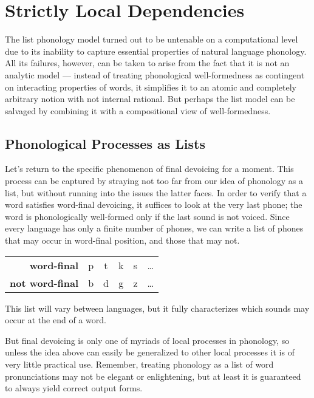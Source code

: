 \chapter{Strictly Local Dependencies}
\label{cha:SL}

The list phonology model turned out to be untenable on a computational level due to its inability to capture essential properties of natural language phonology.
All its failures, however, can be taken to arise from the fact that it is not an analytic model --- instead of treating phonological well-formedness as contingent on interacting properties of words, it simplifies it to an atomic and completely arbitrary notion with not internal rational.
But perhaps the list model can be salvaged by combining it with a compositional view of well-formedness.

\section{Phonological Processes as Lists}
Let's return to the specific phenomenon of final devoicing for a moment.
This process can be captured by straying not too far from our idea of phonology as a list, but without running into the issues the latter faces.
In order to verify that a word satisfies word-final devoicing, it suffices to look at the very last phone;
the word is phonologically well-formed only if the last sound is not voiced.
Since every language has only a finite number of phones, we can write a list of phones that may occur in word-final position, and those that may not.
%
\begin{center}
    \begin{tabular}{r@{\hskip 2em}ccccc}
        \textbf{word-final}     & p & t & k & s & \ldots\\
        \textbf{not word-final} & b & d & g & z & \ldots
    \end{tabular}
\end{center}
%
This list will vary between languages, but it fully characterizes which sounds may occur at the end of a word.

But final devoicing is only one of myriads of local processes in phonology, so unless the idea above can easily be generalized to other local processes it is of very little practical use.
Remember, treating phonology as a list of word pronunciations may not be elegant or enlightening, but at least it is guaranteed to always yield correct output forms.

